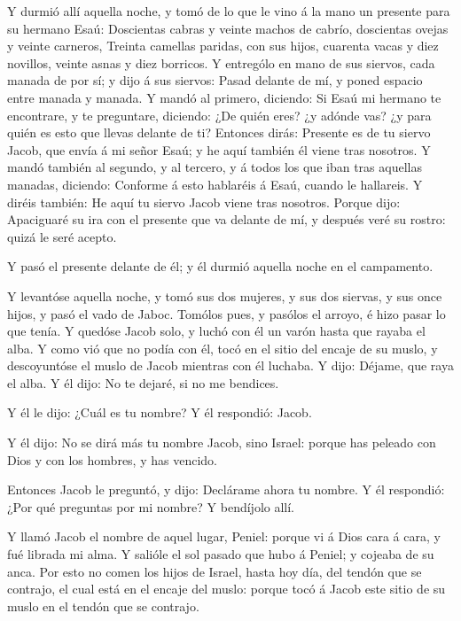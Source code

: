  Y durmió allí aquella noche, y tomó de lo que le vino á la
mano un presente para su hermano Esaú:  Doscientas cabras y
veinte machos de cabrío, doscientas ovejas y veinte carneros,
 Treinta camellas paridas, con sus hijos, cuarenta vacas y
diez novillos, veinte asnas y diez borricos.  Y entrególo
en mano de sus siervos, cada manada de por sí; y dijo á sus siervos:
Pasad delante de mí, y poned espacio entre manada y manada.
 Y mandó al primero, diciendo: Si Esaú mi hermano te
encontrare, y te preguntare, diciendo: ¿De quién eres? ¿y adónde vas? ¿y
para quién es esto que llevas delante de ti?  Entonces
dirás: Presente es de tu siervo Jacob, que envía á mi señor Esaú; y he
aquí también él viene tras nosotros.  Y mandó también al
segundo, y al tercero, y á todos los que iban tras aquellas manadas,
diciendo: Conforme á esto hablaréis á Esaú, cuando le hallareis.
 Y diréis también: He aquí tu siervo Jacob viene tras
nosotros. Porque dijo: Apaciguaré su ira con el presente que va delante
de mí, y después veré su rostro: quizá le seré acepto.

 Y pasó el presente delante de él; y él durmió aquella
noche en el campamento.

 Y levantóse aquella noche, y tomó sus dos mujeres, y sus
dos siervas, y sus once hijos, y pasó el vado de Jaboc. 
Tomólos pues, y pasólos el arroyo, é hizo pasar lo que tenía.
 Y quedóse Jacob solo, y luchó con él un varón hasta que
rayaba el alba.  Y como vió que no podía con él, tocó en el
sitio del encaje de su muslo, y descoyuntóse el muslo de Jacob mientras
con él luchaba.  Y dijo: Déjame, que raya el alba. Y él
dijo: No te dejaré, si no me bendices.

 Y él le dijo: ¿Cuál es tu nombre? Y él respondió: Jacob.

 Y él dijo: No se dirá más tu nombre Jacob, sino Israel:
porque has peleado con Dios y con los hombres, y has vencido.

 Entonces Jacob le preguntó, y dijo: Declárame ahora tu
nombre. Y él respondió: ¿Por qué preguntas por mi nombre? Y bendíjolo
allí.

 Y llamó Jacob el nombre de aquel lugar, Peniel: porque vi
á Dios cara á cara, y fué librada mi alma.  Y salióle el
sol pasado que hubo á Peniel; y cojeaba de su anca.  Por
esto no comen los hijos de Israel, hasta hoy día, del tendón que se
contrajo, el cual está en el encaje del muslo: porque tocó á Jacob este
sitio de su muslo en el tendón que se contrajo.

